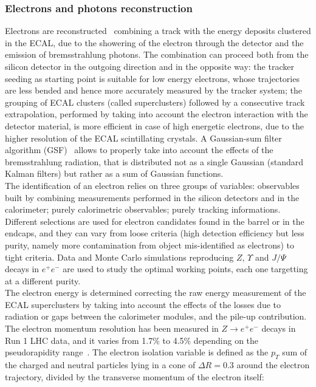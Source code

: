 \subsubsection{Electrons and photons reconstruction}
Electrons are reconstructed~\cite{Chatrchyan:2013dga} combining a track with the energy deposits clustered in the ECAL, due to the showering of the electron through the detector and the emission of bremsstrahlung photons. The combination can proceed both from the silicon detector in the outgoing direction and in the opposite way: the tracker seeding as starting point is suitable for low energy electrons, whose trajectories are less bended and hence more accurately measured by the tracker system; the grouping of ECAL clusters (called superclusters) followed by a consecutive track extrapolation, performed by taking into account the electron interaction with the detector material, is more efficient in case of high energetic electrons, due to the higher resolution of the ECAL scintillating crystals. A Gaussian-sum filter algorithm (GSF)~\cite{Adam:2005bya} allows to properly take into account the effects of the bremsstrahlung radiation, that is distributed not as a single Gaussian (standard Kalman filters) but rather as a sum of Gaussian functions.\\
The identification of an electron relies on three groups of variables: observables built by combining measurements performed in the silicon detectors and in the calorimeter; purely calorimetric observables; purely tracking informations. Different selections are used for electron candidates found in the barrel or in the endcaps, and they can vary from loose criteria (high detection efficiency but less purity, namely more contamination from object mis-identified as electrons) to tight criteria. Data and Monte Carlo simulations reproducing $Z$, $\Upsilon$ and $J/\Psi$ decays in $e^+ e^-$ are used to study the optimal working points, each one targetting at a different purity.\\
The electron energy is determined correcting the raw energy measurement of the ECAL superclusters by taking into account the effects of the losses due to radiation or gaps between the calorimeter modules, and the pile-up contribution. The electron momentum resolution has been measured in $Z \rightarrow e^+ e^-$ decays in Run 1 LHC data, and it varies from 1.7\% to 4.5\% depending on the pseudorapidity range~\cite{Khachatryan:2015hwa}. %
The electron isolation variable is defined as the $p_T$ sum of the charged and neutral particles lying in a cone of $\Delta R = 0.3$ around the electron trajectory, divided by the transverse momentum of the electron itself:
